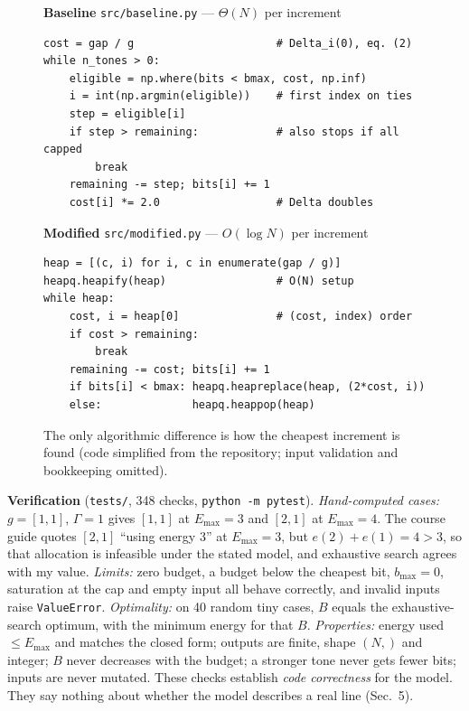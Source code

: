 \documentclass[10pt,a4paper]{article}
\begin{document}
\begin{figure}[t]\centering
\begin{minipage}[t]{0.49\linewidth}
\textbf{\small Baseline} \texttt{\scriptsize src/baseline.py} --- $\Theta(N)$ per increment
\begin{lstlisting}
cost = gap / g                      # Delta_i(0), eq. (2)
while n_tones > 0:
    eligible = np.where(bits < bmax, cost, np.inf)
    i = int(np.argmin(eligible))    # first index on ties
    step = eligible[i]
    if step > remaining:            # also stops if all capped
        break
    remaining -= step; bits[i] += 1
    cost[i] *= 2.0                  # Delta doubles
\end{lstlisting}
\end{minipage}\hfill
\begin{minipage}[t]{0.49\linewidth}
\textbf{\small Modified} \texttt{\scriptsize src/modified.py} --- $O(\log N)$ per increment
\begin{lstlisting}
heap = [(c, i) for i, c in enumerate(gap / g)]
heapq.heapify(heap)                 # O(N) setup
while heap:
    cost, i = heap[0]               # (cost, index) order
    if cost > remaining:
        break
    remaining -= cost; bits[i] += 1
    if bits[i] < bmax: heapq.heapreplace(heap, (2*cost, i))
    else:              heapq.heappop(heap)
\end{lstlisting}
\end{minipage}
\vspace{-4pt}
\caption{The only algorithmic difference is how the cheapest increment is found (code simplified from the repository;
input validation and bookkeeping omitted).}
\label{fig:code}
\end{figure}

\textbf{Verification} (\texttt{tests/}, 348 checks, \texttt{python -m pytest}).
\emph{Hand-computed cases:} $g=[1,1]$, $\Gamma=1$ gives $[1,1]$ at $E_{\max}=3$ and $[2,1]$ at $E_{\max}=4$. The course guide
quotes $[2,1]$ ``using energy 3'' at $E_{\max}=3$, but $e(2)+e(1)=4>3$, so that allocation is infeasible under the stated model,
and exhaustive search agrees with my value.
\emph{Limits:} zero budget, a budget below the cheapest bit, $b_{\max}=0$, saturation at the cap and empty input all behave
correctly, and invalid inputs raise \texttt{ValueError}.
\emph{Optimality:} on 40 random tiny cases, $B$ equals the exhaustive-search optimum, with the minimum energy for that $B$.
\emph{Properties:} energy used $\le E_{\max}$ and matches the closed form; outputs are finite, shape $(N,)$ and integer;
$B$ never decreases with the budget; a stronger tone never gets fewer bits; inputs are never mutated.
These checks establish \emph{code correctness} for the model. They say nothing about whether the model describes a real line (Sec.~5).
\end{document}
